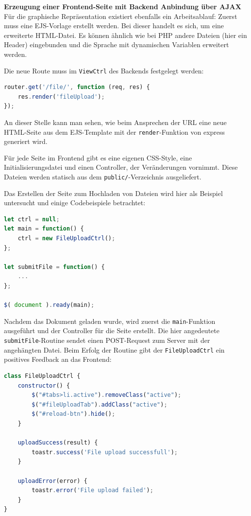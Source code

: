 \textbf{Erzeugung einer Frontend-Seite mit Backend Anbindung über AJAX}\\
Für die graphische Repräsentation existiert ebenfalls ein Arbeitsablauf: Zuerst muss eine EJS-Vorlage erstellt werden. Bei dieser handelt es sich, um eine erweiterte HTML-Datei. Es können ähnlich wie bei PHP andere Dateien (hier ein Header) eingebunden und die Sprache mit dynamischen Variablen erweitert werden.

Die neue Route muss im \lstinline|ViewCtrl| des Backends festgelegt werden:\\

\begin{lstlisting}[language=JavaScript, caption=Definition einer neuen Frontendroute in der viewCtrl.js]
router.get('/file/', function (req, res) {
	res.render('fileUpload');
});
\end{lstlisting}

An dieser Stelle kann man sehen, wie beim Ansprechen der URL eine neue HTML-Seite aus dem EJS-Template mit der \lstinline|render|-Funktion von express generiert wird.

Für jede Seite im Frontend gibt es eine eigenen CSS-Style, eine Initialisierungsdatei und einen Controller, der Veränderungen vornimmt. Diese Dateien werden statisch aus dem \lstinline|public/|-Verzeichnis ausgeliefert.

Das Erstellen der Seite zum Hochladen von Dateien wird hier als Beispiel untersucht und einige Codebeispiele betrachtet: \\

\begin{lstlisting}[language=JavaScript, caption=Initalisierungsfunktion der Uploadseite in der fileUpload.js]
let ctrl = null;
let main = function() {
	ctrl = new FileUploadCtrl();
};

let submitFile = function() {
	...
};

$( document ).ready(main);
\end{lstlisting}

Nachdem das Dokument geladen wurde, wird zuerst die \lstinline|main|-Funktion ausgeführt und der Controller für die Seite erstellt. Die hier angedeutete \lstinline|submitFile|-Routine sendet einen POST-Request zum Server mit der angehängten Datei. Beim Erfolg der Routine gibt der \lstinline|FileUploadCtrl| ein positives Feedback an das Frontend:\\

\begin{lstlisting}[language=JavaScript, caption=Initalisierungsfunktion der Uploadseite in der fileUpload.js]
class FileUploadCtrl {
	constructor() {
		$("#tabs>li.active").removeClass("active");
		$("#fileUploadTab").addClass("active");
		$("#reload-btn").hide();
	}

	uploadSuccess(result) {
		toastr.success('File upload successfull');
	}

	uploadError(error) {
		toastr.error('File upload failed');
	}
}        
\end{lstlisting}

